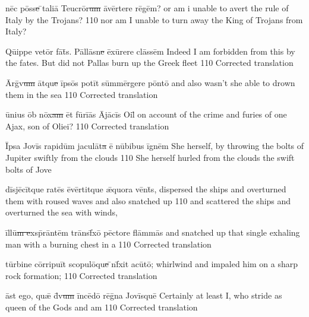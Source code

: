 \latline
  {n\=ec p\=oss\sout{e }\={}t\-al\-i\={\macron a} T\-e\-ucr\={\macron o}r\sout{um }\={\macron a}v\=ert\-er\-e r\={\macron e}g\=em?}
  {or am i unable to avert the rule of Italy by the Trojans? }
  {110} %
  {nor am I unable to turn away the King of Trojans from Italy?}
  {
  }

\latline
  {Q\={ui}pp\-e v\-et\=or f\={\macron a}t\={\macron{\i}}s.  P\=all\=asn\sout{e }\=ex\={\macron u}r\-er\-e cl\=ass\=em}
  {Indeed I am forbidden from this by the fates.  But did not Pallas burn up the Greek fleet }
  {110} %
  {Corrected translation}
  {
  }



\latline
  {\=Arg\={\macron{\i}}v\sout{um }\=atqu\sout{e }\=ips\={\macron o}s p\-ot\=it s\=umm\=erg\-er\-e p\=ont\={\macron o}}
  {and also wasn't she able to drown them in the sea}
  {110} %
  {Corrected translation}
  {
  }

\latline
  {\={\macron u}n\-i\-us \=ob n\=ox\sout{am }\=et f\=ur\=i\={\macron a}s \=Aj\={\macron a}c\=is \-O\-il\={\macron{\i}}}
  {on account of the crime and furies of one Ajax, son of Oliei?}
  {110} %
  {Corrected translation}
  {
  }

\latline
  {\=Ips\-a J\-ov\=is r\-ap\-id\=um j\-ac\-ul\={\macron a}t\sout{a }\={\macron e} n\={\macron u}b\-ib\-us \=ign\=em}
  {She herself, by throwing the bolts of Jupiter swiftly from the clouds}
  {110} %
  {She herself hurled from the clouds the swift bolts of Jove}
  {
  }

\latline
  {d\=isj\={\macron e}c\=itqu\-e r\-at\={\macron e}s \={\macron e}v\=ert\-itqu\-e \={\ae}qu\-or\-a v\=ent\={\macron{\i}}s,}
  {dispersed the ships and overturned them with roused waves and also snatched up }
  {110} %
  {and scattered the ships and overturned the sea with winds,}
  {
  }

\latline
  {\=ill\=u\sout{m e}xsp\={\macron{\i}}r\=ant\=em tr\={\macron a}nsf\={\macron{\i}}x\={\macron o} p\=ect\-or\-e fl\=amm\={\macron a}s}
  {and snatched up that single exhaling man with a burning chest in a}
  {110} %
  {Corrected translation}
  {
  }

\latline
  {t\=urb\-in\-e c\=orr\-ip\-u\=it sc\-op\-ul\={\macron o}qu\sout{e }\={\macron{\i}}nf\={\macron{\i}}x\-it \-ac\={\macron u}t\={\macron o};}
  {whirlwind  and impaled him on a sharp rock formation;}
  {110} %
  {Corrected translation}
  {
  }

\latline
  {\=ast \-eg\-o, qu\={\ae} d\={\macron{\i}}v\sout{um }\=inc\={\macron e}d\={\macron o} r\={\macron e}g\={\macron{\i}}n\-a J\-ov\=isqu\=e}
  {Certainly at least I, who stride as queen of the Gods and am }
  {110} %
  {Corrected translation}
  {
  }

